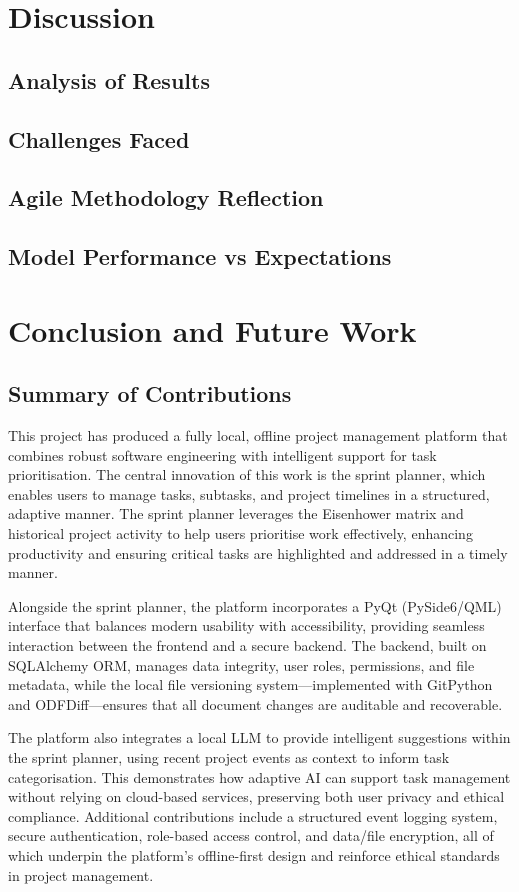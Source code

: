 \documentclass{report}
\begin{document}
\chapter{Discussion}  %
\section{Analysis of Results}
\section{Challenges Faced}
\section{Agile Methodology Reflection}
\section{Model Performance vs Expectations}

\chapter{Conclusion and Future Work}  %
\section{Summary of Contributions}
This project has produced a fully local, offline project management platform that combines robust software engineering with intelligent support for task prioritisation. The central innovation of this work is the sprint planner, which enables users to manage tasks, subtasks, and project timelines in a structured, adaptive manner. The sprint planner leverages the Eisenhower matrix and historical project activity to help users prioritise work effectively, enhancing productivity and ensuring critical tasks are highlighted and addressed in a timely manner.

Alongside the sprint planner, the platform incorporates a PyQt (PySide6/QML) interface that balances modern usability with accessibility, providing seamless interaction between the frontend and a secure backend. The backend, built on SQLAlchemy ORM, manages data integrity, user roles, permissions, and file metadata, while the local file versioning system—implemented with GitPython and ODFDiff—ensures that all document changes are auditable and recoverable.

The platform also integrates a local LLM to provide intelligent suggestions within the sprint planner, using recent project events as context to inform task categorisation. This demonstrates how adaptive AI can support task management without relying on cloud-based services, preserving both user privacy and ethical compliance. Additional contributions include a structured event logging system, secure authentication, role-based access control, and data/file encryption, all of which underpin the platform's offline-first design and reinforce ethical standards in project management.
\end{document}

